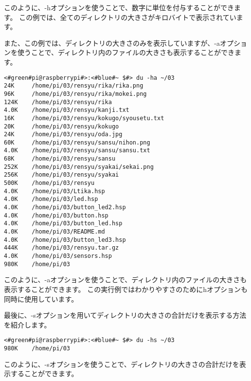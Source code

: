 このように、-hオプションを使うことで、数字に単位を付与することができます。
この例では、全てのディレクトリの大きさがキロバイトで表示されています。

また、この例では、ディレクトリの大きさのみを表示していますが、-aオプションを使うことで、ディレクトリ内のファイルの大きさも表示することができます。

\begin{lstlisting}[caption=du -haの実行例, label=du_example]
<#green#pi@raspberrypi#>:<#blue#~ $#> du -ha ~/03
24K     /home/pi/03/rensyu/rika/rika.png
96K     /home/pi/03/rensyu/rika/mokei.png
124K	/home/pi/03/rensyu/rika
4.0K	/home/pi/03/rensyu/kanji.txt
16K     /home/pi/03/rensyu/kokugo/syousetu.txt
20K     /home/pi/03/rensyu/kokugo
24K     /home/pi/03/rensyu/oda.jpg
60K     /home/pi/03/rensyu/sansu/nihon.png
4.0K	/home/pi/03/rensyu/sansu/sansu.txt
68K     /home/pi/03/rensyu/sansu
252K	/home/pi/03/rensyu/syakai/sekai.png
256K	/home/pi/03/rensyu/syakai
500K	/home/pi/03/rensyu
4.0K	/home/pi/03/Ltika.hsp
4.0K	/home/pi/03/led.hsp
4.0K	/home/pi/03/button_led2.hsp
4.0K	/home/pi/03/button.hsp
4.0K	/home/pi/03/button_led.hsp
4.0K	/home/pi/03/README.md
4.0K	/home/pi/03/button_led3.hsp
444K	/home/pi/03/rensyu.tar.gz
4.0K	/home/pi/03/sensors.hsp
980K	/home/pi/03
\end{lstlisting}

このように、-aオプションを使うことで、ディレクトリ内のファイルの大きさも表示することができます。
この実行例ではわかりやすさのためにhオプションも同時に使用しています。

最後に、-sオプションを用いてディレクトリの大きさの合計だけを表示する方法を紹介します。

\begin{lstlisting}[caption=du -hsの実行例, label=du_example]
<#green#pi@raspberrypi#>:<#blue#~ $#> du -hs ~/03
980K	/home/pi/03
\end{lstlisting}

このように、-sオプションを使うことで、ディレクトリの大きさの合計だけを表示することができます。

\begin{tcolorbox}[title=\useOmetoi]
    \begin{enumerate}
    \end{enumerate}
\end{tcolorbox}

